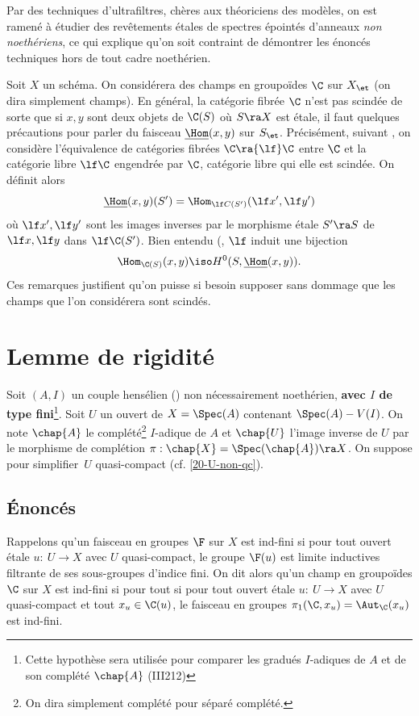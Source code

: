 \documentclass[10pt]{../fichiers-configuration-latex/smfart}
\begin{document}
Par des techniques d'ultrafiltres, chères aux théoriciens des modèles, on est ramené à étudier des
revêtements étales de spectres épointés d'anneaux \textit{non noethériens}, ce qui explique qu'on
soit contraint de démontrer les énoncés techniques hors de tout cadre noethérien.

\begin{remarque0}\label{precau-champ} Soit $X$ un schéma. On considérera des champs en groupoïdes
$\C$ sur $X_\et$ (on dira simplement champs).  En général, la catégorie fibrée $\C$ n'est pas
scindée de sorte que si $x,y$ sont deux objets de $\C(S)$ où $S\ra X$ est étale, il faut quelques
précautions pour parler du faisceau  $\underline{\Hom}(x,y)$ sur $S_\et$. Précisément, suivant
\cite[I.2.6.3.1]{CNA@Giraud}, on considère l'équivalence de catégories fibrées $\C\ra{\lf}\C$ entre
$\C$ et la catégorie libre ${\lf}\C$ engendrée par $\C$, catégorie libre qui elle est scindée. On
définit alors $$\underline{\Hom}(x,y)(S')=\Hom_{{\lf}C(S')}({\lf}x',{\lf}y')$$ où
${\lf}x',{\lf}y'$ sont les images inverses par le morphisme étale $S'\ra S$ de $\lf x,\lf y$ dans
$\lf\C(S')$. Bien entendu (\cite[I.2.6.3.2 (1)]{CNA@Giraud}, $\lf$ induit une bijection
$$\Hom_{\C(S)}(x,y)\iso H^0(S,\underline{\Hom}(x,y)).$$ Ces remarques justifient qu'on puisse
si besoin supposer  sans dommage que les champs que l'on considérera sont scindés.  \end{remarque0}

\section{Lemme de rigidité} Soit $(A,I)$ un couple hensélien () non
nécessairement noethérien, \textbf{avec $I$ de type fini}\footnote{Cette hypothèse sera utilisée
pour comparer les gradués $I$-adiques de $A$ et de son complété $\chap{A}$ (\ac{III}{2}{12}{})}.
Soit $U$ un ouvert de $X=\Spec(A)$ contenant $\Spec(A)-V(I)$. On note $\chap{A}$ le complété\footnote{On dira
simplement complété pour séparé complété.} $I$-adique de $A$ et $\chap{U}$ l'image inverse de $U$
par le morphisme de complétion $\pi:\chap{X}=\Spec(\chap{A})\ra X$.
On suppose pour simplifier $U$ quasi-compact (cf. \ref{20-U-non-qc}).

\subsection{Énoncés}\label{20-sec-enonc} Rappelons  qu'un faisceau en groupes $\F$
sur $X$  est ind-fini si pour tout ouvert étale $u:\ U\rightarrow X$ avec $U$ quasi-compact, le
groupe $\F(u)$ est limite inductives filtrante de ses sous-groupes d'indice fini. On dit alors qu'un
champ en groupoïdes $\C$ sur $X$ est ind-fini si pour tout si pour tout ouvert étale $u:\
U\rightarrow X$ avec $U$ quasi-compact et tout $x_u\in\C(u)$, le faisceau en groupes
$\pi_1(\C,x_u)=\Aut_\C(x_u)$ est ind-fini.
\end{document}
